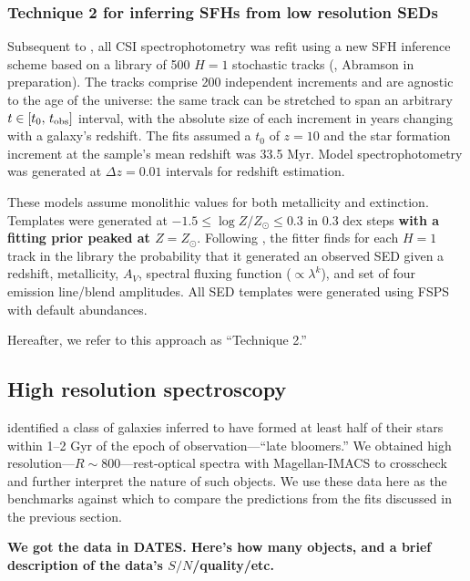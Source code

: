 \documentclass[a4paper,fleqn,usenatbib]{mnras}
\newcommand{\logZ}{\log Z/Z_{\odot}}
\newcommand{\bfr}{\bf\color{red}}
\newcommand{\tobs}{t_{\rm obs}}
\begin{document}
\subsubsection{Technique 2 for inferring SFHs from low resolution SEDs}
\label{sec:h1}

Subsequent to \citet{Dressler18}, all CSI spectrophotometry was refit using a new 
SFH inference scheme based on a library of 500 $H=1$ stochastic tracks
(\citealt{Kelson14,Kelson16,Kelson20}, Abramson in preparation). The tracks comprise 200 
independent increments and are agnostic to the age of the universe: the same track can be stretched 
to span an arbitrary $t\in[t_{0},\,\tobs]$ interval, with the absolute size of each increment in years 
changing with a galaxy's redshift. The fits assumed a $t_{0}$ of $z=10$ and the star formation 
increment at the sample's mean redshift was 33.5 Myr. Model spectrophotometry was
generated at $\Delta z = 0.01$ intervals for redshift estimation.

These models assume monolithic values for both metallicity and extinction. Templates were generated
at $-1.5\leq\logZ\leq0.3$ in 0.3 dex steps {\bfr with a fitting prior peaked at $Z=Z_{\odot}$}. Following 
\citealt{Pacifici12}, the fitter finds for each $H=1$ track in the library the probability that it generated
an observed SED given a redshift, metallicity, $A_{V}$, spectral fluxing function 
({\bfr $\propto \lambda^{k}$}), and set of four emission line/blend amplitudes. All SED templates 
were generated using FSPS with default abundances.

Hereafter, we refer to this approach as ``Technique 2.''

\subsection{High resolution spectroscopy}
\label{sec:hiRes}

\citet{Dressler16, Dressler18} identified a class of galaxies inferred to have formed at least half of 
their stars within 1--2 Gyr of the epoch of observation---``late bloomers.'' We obtained high 
resolution---$R\sim800$---rest-optical spectra with Magellan-IMACS to crosscheck and further 
interpret the nature of such objects. We use these data here as the benchmarks against which to
compare the predictions from the fits discussed in the previous section.

{\bfr We got the data in DATES. Here's how many objects, and a brief description of the data's
$S/N$/quality/etc.}
\end{document}
